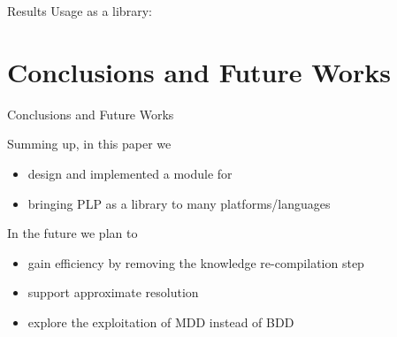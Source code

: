 \documentclass[presentation]{beamer}\mode<presentation>{\usetheme{AMSBolognaFC}}
\begin{document}
\begin{frame}[c, allowframebreaks]{Results}
    Usage as a library:

    

    

    

    

\end{frame}

\section{Conclusions and Future Works}

\begin{frame}[c]{Conclusions and Future Works}

    \begin{block}{Summing up, in this paper we}
        \begin{itemize}
            \item design and implemented a \alert{\problog{} module} for \twopkt{}
            \item bringing \alert{PLP as a library} to \alert{many platforms}/languages
        \end{itemize}
    \end{block}

    \begin{exampleblock}{In the future we plan to}
        \begin{itemize}
            \item gain efficiency by removing the \alert{knowledge re-compilation} step
            \item support \alert{approximate} resolution
            \item explore the exploitation of \alert{MDD} instead of BDD
        \end{itemize}
    \end{exampleblock}

\end{frame}
\end{document}
